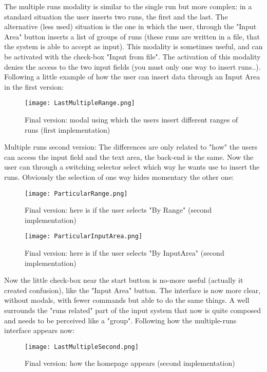 The multiple runs modality is similar to the single run but more complex: in a standard situation the user inserts two runs, the first and the last. The alternative (less used) situation is the one in which the user, through the "Input Area" button inserts a list of groups of runs (these runs are written in a file, that the system is able to accept as input). This modality is sometimes useful, and can be activated with the check-box "Input from file". The activation of this modality denies the access to the two input fields (you must only one way to insert runs..).
Following a little example of how the user can insert data through an Input Area in the first version:

\begin{figure}[H]
\centering
\texttt{[image: LastMultipleRange.png]} 
\caption{Final version: modal using which the users insert different ranges of runs (first implementation)}
\end{figure}   

Multiple runs second version:
The differences are only related to "how" the users can access the input field and the text area, the back-end is the same. Now the user can through a switching selector select which way he wants use to insert the runs. Obviously the selection of one way hides momentary the other one:

\begin{figure}[H]
\centering
\texttt{[image: ParticularRange.png]} 
\caption{Final version: here is if the user selects "By Range" (second implementation)}
\end{figure}   

\begin{figure}[H]
\centering
\texttt{[image: ParticularInputArea.png]} 
\caption{Final version: here is if the user selects "By InputArea" (second implementation)}
\end{figure}   

Now the little check-box near the start button is no-more useful (actually it created confusion), like the "Input Area" button. The interface is now more clear, without modals, with fewer commands but able to do the same things. A well surrounds the "runs related" part of the input system that now is quite composed and needs to be perceived like a "group".
Following how the multiple-runs interface appears now:

\begin{figure}[H]
\centering
\texttt{[image: LastMultipleSecond.png]} 
\caption{Final version: how the homepage appears (second implementation)}
\end{figure}  

